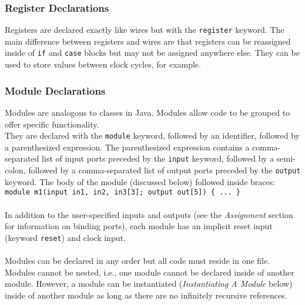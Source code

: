 \documentclass[letterpaper,11pt]{article}
\begin{document}
        \subsubsection{Register Declarations}
        Registers are declared exactly like wires but with the \texttt{register} keyword.
        The main difference between registers and wires are that registers can be reassigned 
        inside of \texttt{if} and \texttt{case} blocks but may not be assigned anywhere else.  They can be used to store values between clock 
        cycles, for example.\\
        
        \subsubsection{Module Declarations}
        Modules are analogous to classes in Java.  Modules allow code to be grouped to offer
        specific functionality.\\
        They are declared with the \texttt{module} keyword, followed by an identifier, followed by a
        parenthesized expression.  The parenthesized expression contains a comma-separated list of
        input ports preceded by the \texttt{input} keyword, followed by a semi-colon, followed by a
        comma-separated list of output ports preceded by the \texttt{output} keyword.  The body of
        the module (discussed below) followed inside braces:\\
        
        \texttt{module m1(input in1, in2, in3[3]; output out[5]) \{ ... \} }\\\\
        In addition to the user-specified inputs and outputs (see the \emph{Assignment} section for
        information on binding ports), each module has an implicit reset input (keyword \texttt{reset})
        and clock input.\\\\
        
        Modules can be declared in any order but all code must reside in one file.  Modules cannot be 
        nested, i.e., one module cannot be declared inside of another module.  However, a module can be 
        instantiated (\emph{Instantiating A Module} below) inside of another module as long as there are 
        no infinitely recursive references.
        
        
\end{document}
